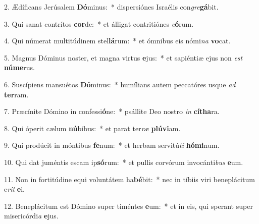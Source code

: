 2. Ædíficans Jerúsalem \textbf{Dó}minus:~*  dispersiónes Israélis con\textit{gre}\textbf{gá}bit.\

3. Qui sanat contrítos \textbf{cor}de:~*  et álligat contritiónes \textit{e}\textbf{ó}rum.\

4. Qui númerat multitúdinem stel\textbf{lá}rum:~*  et ómnibus eis nómi\textit{na} \textbf{vo}cat.\

5. Magnus Dóminus noster, et magna virtus \textbf{e}jus:~*  et sapiéntiæ ejus non \textit{est} \textbf{nú}\textbf{me}rus.\

6. Suscípiens mansuétos \textbf{Dó}minus:~*  humílians autem peccatóres usque \textit{ad} \textbf{ter}ram.\

7. Præcínite Dómino in confessi\textbf{ó}ne:~*  psállite Deo nostro \textit{in} \textbf{cí}\textbf{tha}ra.\

8. Qui óperit cælum \textbf{nú}bibus:~*  et parat ter\textit{ræ} \textbf{plú}\textbf{vi}am.\

9. Qui prodúcit in móntibus \textbf{fe}num:~*  et herbam servitú\textit{ti} \textbf{hó}\textbf{mi}num.\

10. Qui dat juméntis escam ip\textbf{só}rum:~*  et pullis corvórum invocánti\textit{bus} \textbf{e}um.\

11. Non in fortitúdine equi voluntátem ha\textbf{bé}bit:~*  nec in tíbiis viri beneplácitum e\textit{rit} \textbf{e}i.\

12. Beneplácitum est Dómino super timéntes \textbf{e}um:~*  et in eis, qui sperant super misericórdi\textit{a} \textbf{e}jus.\

